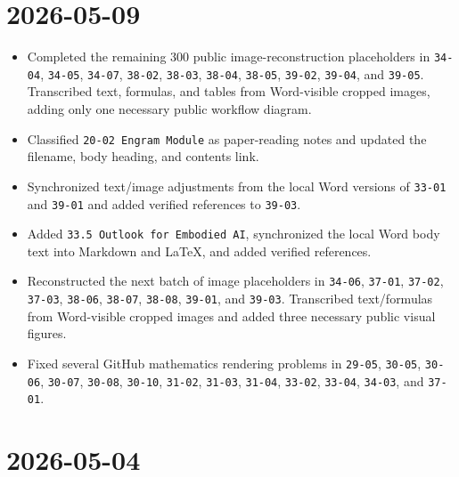 \hypertarget{section-6}{%
\section{2026-05-09}\label{section-6}}

\begin{itemize}
\tightlist
\item
  Completed the remaining 300 public image-reconstruction placeholders in \texttt{34-04}, \texttt{34-05}, \texttt{34-07}, \texttt{38-02}, \texttt{38-03}, \texttt{38-04}, \texttt{38-05}, \texttt{39-02}, \texttt{39-04}, and \texttt{39-05}. Transcribed text, formulas, and tables from Word-visible cropped images, adding only one necessary public workflow diagram.
\item
  Classified \texttt{20-02\ Engram\ Module} as paper-reading notes and updated the filename, body heading, and contents link.
\item
  Synchronized text/image adjustments from the local Word versions of \texttt{33-01} and \texttt{39-01} and added verified references to \texttt{39-03}.
\item
  Added \texttt{33.5\ Outlook\ for\ Embodied\ AI}, synchronized the local Word body text into Markdown and LaTeX, and added verified references.
\item
  Reconstructed the next batch of image placeholders in \texttt{34-06}, \texttt{37-01}, \texttt{37-02}, \texttt{37-03}, \texttt{38-06}, \texttt{38-07}, \texttt{38-08}, \texttt{39-01}, and \texttt{39-03}. Transcribed text/formulas from Word-visible cropped images and added three necessary public visual figures.
\item
  Fixed several GitHub mathematics rendering problems in \texttt{29-05}, \texttt{30-05}, \texttt{30-06}, \texttt{30-07}, \texttt{30-08}, \texttt{30-10}, \texttt{31-02}, \texttt{31-03}, \texttt{31-04}, \texttt{33-02}, \texttt{33-04}, \texttt{34-03}, and \texttt{37-01}.
\end{itemize}

\hypertarget{section-7}{%
\section{2026-05-04}\label{section-7}}

